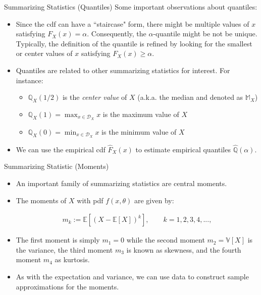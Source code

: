 \documentclass[9pt]{beamer}
\begin{document}
%
\begin{frame}{Summarizing Statistics (Quantiles)}
Some important observations about quantiles:
\begin{block}{}
\begin{itemize}
\item Since the cdf can have a ``staircase" form, there might be multiple values of $x$ satisfying $F_X(x)=\alpha$. Consequently, the $\alpha$-quantile might be not be unique. Typically,  the definition of the quantile is refined by looking for the smallest or center values of $x$ satisfying $F_X(x)\geq \alpha$. 

\item Quantiles are related to other summarizing statistics for interest. For instance: 
\begin{itemize}
\item $\mathbb{Q}_{X}(1/2)$ is the {\em center value} of $X$ (a.k.a. the median and denoted as $\mathbb{M}_X$)
\item $\mathbb{Q}_X(1)=\max_{x\in \mathcal{D}_X }x$ is the maximum value of $X$
\item $\mathbb{Q}_{X}(0)=\min_{x\in \mathcal{D}_X }x$ is the minimum value of $X$ 
\end{itemize}
\item We can use the empirical cdf $\hat{F}_X(x)$ to estimate empirical quantiles $\hat{\mathbb{Q}}(\alpha)$.
\end{itemize}
\end{block}
\end{frame}

\begin{frame}{Summarizing Statistic (Moments)}

\begin{itemize}
\item An important family of summarizing statistics are central moments. 

\item The moments of $X$ with pdf $f(x,\theta)$ are given by:
\begin{block}{}
\begin{align*}
m_k:=\mathbb{E}[(X-\mathbb{E}[X])^k], \qquad k=1,2,3,4,...,
\end{align*}
\end{block}

\item The first moment is simply $m_1=0$ while the second moment $m_2=\mathbb{V}[X]$ is the variance, the third moment $m_3$ is known as skewness, and the fourth moment  $m_4$ as kurtosis. 

\item As with the expectation and variance, we can use data to construct sample approximations for the moments. 

\end{itemize}

\end{frame}
\end{document}
